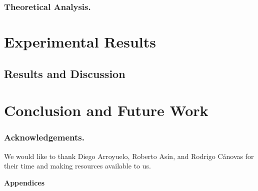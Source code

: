 \documentclass[runningheads]{llncs}
\begin{document}
\subsubsection{Theoretical Analysis.}
\label{subsec:theoreticalAnalysis}


%


\section{Experimental Results}
\label{sec:exps}



\subsection{Results and Discussion}
\label{subsec:resultsDiscussion}



\section{Conclusion and Future Work}
\label{sec:conclusion}


\subsubsection*{Acknowledgements.}
We would like to thank Diego Arroyuelo, Roberto As\'{i}n, and Rodrigo
C\'{a}novas for their time and making resources available to us.




\newpage
\appendix
\begin{center}
  \bf \Large Appendices
\end{center}



\end{document}
